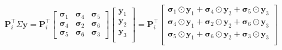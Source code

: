 \begin{equation}
\mathbf{P}_i^\top\Sigma\mathbf{y} =
\mathbf{P}_i^\top
\left[\begin{matrix}
    \boldsymbol{\sigma}_{1} & \boldsymbol{\sigma}_{4} & \boldsymbol{\sigma}_{5} \\
    \boldsymbol{\sigma}_{4} & \boldsymbol{\sigma}_{2} & \boldsymbol{\sigma}_{6} \\
    \boldsymbol{\sigma}_{5} & \boldsymbol{\sigma}_{6} & \boldsymbol{\sigma}_{3}
\end{matrix}\right]
\left[
    \begin{matrix}
        \mathbf{y}_1\\
        \mathbf{y}_2\\
        \mathbf{y}_3\\
    \end{matrix}
\right]
=
\mathbf{P}_i^\top
\left[
    \begin{matrix}
        \boldsymbol{\sigma}_{1} \odot \mathbf{y}_1 + \boldsymbol{\sigma}_{4} \odot \mathbf{y}_2 + \boldsymbol{\sigma}_{5} \odot \mathbf{y}_3\\
        \boldsymbol{\sigma}_{4} \odot \mathbf{y}_1 + \boldsymbol{\sigma}_{2} \odot \mathbf{y}_2 + \boldsymbol{\sigma}_{6} \odot \mathbf{y}_3\\
        \boldsymbol{\sigma}_{5} \odot \mathbf{y}_1 + \boldsymbol{\sigma}_{6} \odot \mathbf{y}_2 + \boldsymbol{\sigma}_{3} \odot \mathbf{y}_3\\
    \end{matrix}
\right]
\end{equation}
